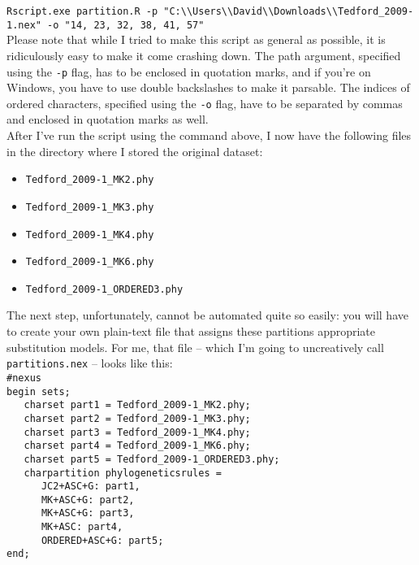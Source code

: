 \documentclass[12pt]{article}
\begin{document}
\texttt{Rscript.exe partition.R -p "C:\textbackslash$\!$\textbackslash Users\textbackslash$\!$\textbackslash David\textbackslash$\!$\textbackslash Downloads\textbackslash$\!$\textbackslash Tedford\_2009-1.nex" -o "14, 23, 32, 38, 41, 57"} \\

\noindent Please note that while I tried to make this script as general as possible, it is ridiculously easy to make it come crashing down. The path argument, specified using the \texttt{-p} flag, has to be enclosed in quotation marks, and if you're on Windows, you have to use double backslashes to make it parsable. The indices of ordered characters, specified using the \texttt{-o} flag, have to be separated by commas and enclosed in quotation marks as well. \\

\noindent After I've run the script using the command above, I now have the following files in the directory where I stored the original dataset:

\begin{itemize}
\setlength\itemsep{-0.1em}
  \item \texttt{Tedford\_2009-1\_MK2.phy}
  \item \texttt{Tedford\_2009-1\_MK3.phy}
  \item \texttt{Tedford\_2009-1\_MK4.phy}
  \item \texttt{Tedford\_2009-1\_MK6.phy}
  \item \texttt{Tedford\_2009-1\_ORDERED3.phy}
\end{itemize}

\noindent The next step, unfortunately, cannot be automated quite so easily: you will have to create your own plain-text file that assigns these partitions appropriate substitution models. For me, that file -- which I'm going to uncreatively call \texttt{partitions.nex} -- looks like this: \\

\texttt{\#nexus} \\
\indent\texttt{begin sets;} \\
\indent\texttt{\ \ \ charset part1 = Tedford\_2009-1\_MK2.phy;} \\
\indent\texttt{\ \ \ charset part2 = Tedford\_2009-1\_MK3.phy;} \\
\indent\texttt{\ \ \ charset part3 = Tedford\_2009-1\_MK4.phy;} \\
\indent\texttt{\ \ \ charset part4 = Tedford\_2009-1\_MK6.phy;} \\
\indent\texttt{\ \ \ charset part5 = Tedford\_2009-1\_ORDERED3.phy;} \\
\indent\texttt{\ \ \ charpartition phylogeneticsrules =} \\
\indent\texttt{\ \ \ \ \ \ JC2+ASC+G: part1,} \\
\indent\texttt{\ \ \ \ \ \ MK+ASC+G: part2,} \\
\indent\texttt{\ \ \ \ \ \ MK+ASC+G: part3,} \\
\indent\texttt{\ \ \ \ \ \ MK+ASC: part4,} \\
\indent\texttt{\ \ \ \ \ \ ORDERED+ASC+G: part5;} \\
\indent\texttt{end;} \\
\end{document}
